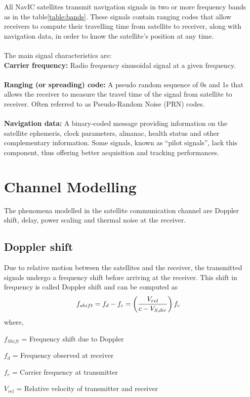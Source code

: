 \documentclass[11pt]{book}
\begin{document}
All NavIC satellites transmit navigation signals in two or more frequency bands as in the table\ref{table:bands}. These signals contain ranging codes that allow receivers to compute their travelling time from satellite to receiver, along with navigation data, in order to know the satellite’s position at any time. \\
\\The main signal characteristics are:
\\
\textbf{Carrier frequency:} Radio frequency sinusoidal signal at a given frequency.
\\\\
\textbf{Ranging (or spreading) code:} A pseudo random sequence of 0s and 1s that allows the receiver to measure the travel time of the signal from satellite to receiver. Often referred to as Pseudo-Random Noise (PRN) codes.
\\\\
\textbf{Navigation data:} A binary-coded message providing information on the satellite ephemeris, clock parameters, almanac, health status and other complementary information. Some signals, known as “pilot signals”, lack this component, thus offering better acquisition and tracking performances.




\chapter{Channel Modelling}
The phenomena modelled in the satellite communication channel are Doppler shift, delay, power scaling and thermal noise at the receiver.
\section{Doppler shift}
Due to relative motion between the satellites and the receiver, the transmitted signals undergo a frequency shift before arriving at the receiver. This shift %
in frequency is called Doppler shift and can be computed as
\begin{equation}
    f_{shift} = f_{d}-f_{c} = \left(\frac{V_{rel}}{c-V_{S,dir}}\right)f_{c}  
\end{equation}
where,

$f_{Shift}$ = Frequency shift due to Doppler

$f_{d}$ = Frequency observed at receiver

$f_{c}$ = Carrier frequency at transmitter

$V_{rel}$ = Relative velocity of transmitter and receiver
\end{document}
